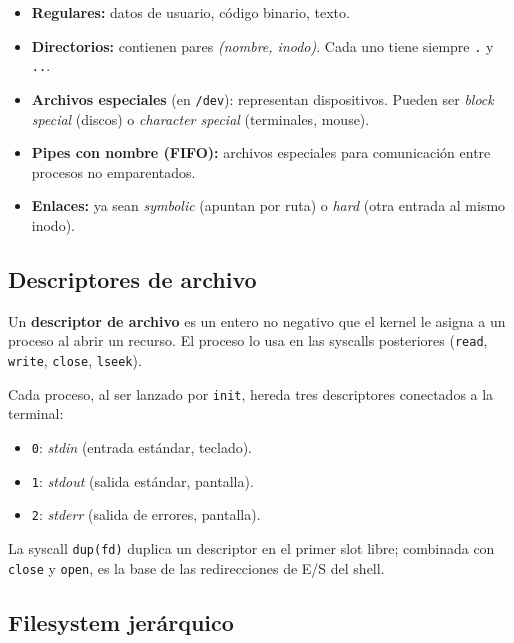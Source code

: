 \documentclass[11pt,a4paper]{article}
\begin{document}
\begin{itemize}[leftmargin=*]
    \item \textbf{Regulares:} datos de usuario, código binario, texto.
    \item \textbf{Directorios:} contienen pares
        \emph{(nombre, inodo)}. Cada uno tiene siempre \texttt{.} y
        \texttt{..}.
    \item \textbf{Archivos especiales} (en \texttt{/dev}): representan
        dispositivos. Pueden ser \emph{block special} (discos) o
        \emph{character special} (terminales, mouse).
    \item \textbf{Pipes con nombre (FIFO):} archivos especiales para
        comunicación entre procesos no emparentados.
    \item \textbf{Enlaces:} ya sean \emph{symbolic} (apuntan por ruta)
        o \emph{hard} (otra entrada al mismo inodo).
\end{itemize}

\subsection{Descriptores de archivo}

\begin{definicion}
Un \textbf{descriptor de archivo} es un entero no negativo que el
kernel le asigna a un proceso al abrir un recurso. El proceso lo usa
en las syscalls posteriores (\texttt{read}, \texttt{write},
\texttt{close}, \texttt{lseek}).
\end{definicion}

Cada proceso, al ser lanzado por \texttt{init}, hereda tres
descriptores conectados a la terminal:

\begin{itemize}[leftmargin=*]
    \item \texttt{0}: \emph{stdin} (entrada estándar, teclado).
    \item \texttt{1}: \emph{stdout} (salida estándar, pantalla).
    \item \texttt{2}: \emph{stderr} (salida de errores, pantalla).
\end{itemize}

La syscall \texttt{dup(fd)} duplica un descriptor en el primer slot
libre; combinada con \texttt{close} y \texttt{open}, es la base de las
redirecciones de E/S del shell.

\subsection{Filesystem jerárquico}
\end{document}
